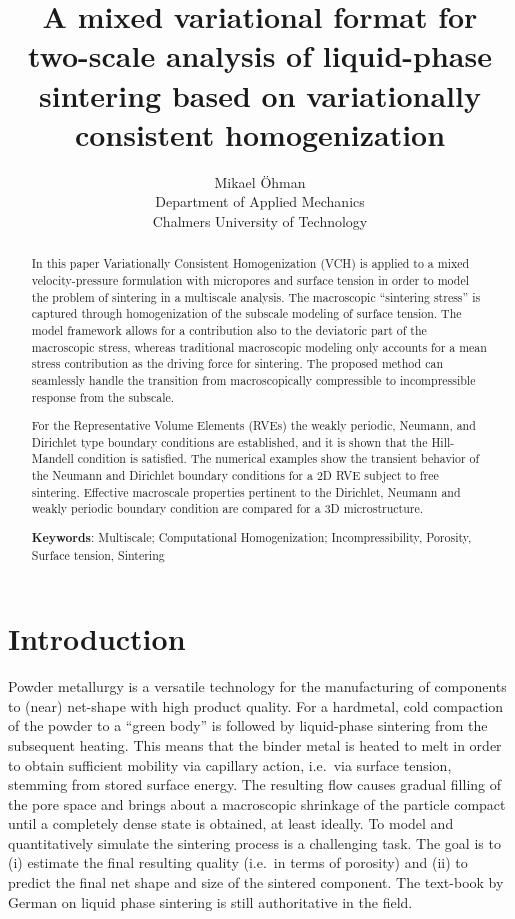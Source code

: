 \documentclass[12pt,a4paper]{article}
\title{A mixed variational format for two-scale analysis of liquid-phase sintering based on variationally consistent homogenization}
\author{
Mikael Öhman\\
Department of Applied Mechanics \\
Chalmers University of Technology}
\begin{document}
\maketitle
\begin{abstract}
In this paper Variationally Consistent Homogenization (VCH) is applied to a mixed velocity-pressure formulation with micropores and surface tension in order to model the problem of sintering in a multiscale analysis.
The macroscopic ``sintering stress'' is captured through homogenization of the subscale modeling of surface tension.
The model framework allows for a contribution also to the deviatoric part of the macroscopic stress, whereas traditional macroscopic modeling only accounts for a mean stress contribution as the driving force for sintering.
The proposed method can seamlessly handle the transition from macroscopically compressible to incompressible response from the subscale.

For the Representative Volume Elements (RVEs) the weakly periodic, Neumann, and Dirichlet type boundary conditions are established, and it is shown that the Hill-Mandell condition is satisfied.
The numerical examples show the transient behavior of the Neumann and Dirichlet boundary conditions for a 2D RVE subject to free sintering.
Effective macroscale properties pertinent to the Dirichlet, Neumann and weakly periodic boundary condition are compared for a 3D microstructure.


\textbf{Keywords}:
Multiscale; Computational Homogenization; Incompressibility, Porosity, Surface tension, Sintering
\end{abstract}

\section{Introduction}
Powder metallurgy is a versatile technology for the manufacturing of components to (near) net-shape with high product quality.
For a hardmetal, cold compaction of the powder to a ``green body'' is followed by liquid-phase sintering from the subsequent heating.
This means that the binder metal is heated to melt in order to obtain sufficient mobility via capillary action, i.e.\ via surface tension, stemming from stored surface energy.
The resulting flow causes gradual filling of the pore space and brings about a macroscopic shrinkage of the particle compact until a completely dense state is obtained, at least ideally.
To model and quantitatively simulate the sintering process is a challenging task.
The goal is to (i) estimate the final resulting quality (i.e.\ in terms of porosity) and (ii) to predict the final net shape and size of the sintered component.
The text-book by German \cite{german_sintering_1996} on liquid phase sintering is still authoritative in the field.
\end{document}
